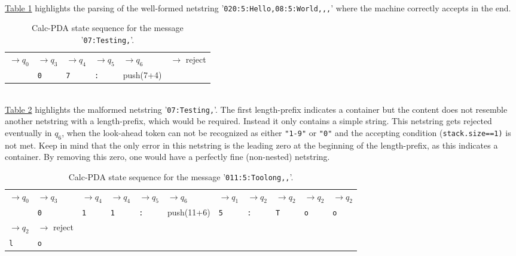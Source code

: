 \\\hyperref[tab:tab1-netstring-1-Calc-pda-state-sequence]{Table 1} highlights the parsing of the well-formed netstring '\texttt{020:5:Hello,08:5:World,,,}' where the machine correctly accepts in the end.\\
\begin{table}
    \centering
    \begin{tabular}{|llllll|}\hline
         $\rightarrow q_0$ &$\rightarrow q_3$ & $\rightarrow q_4$ & $\rightarrow q_5$ & $\rightarrow q_6$ & $\rightarrow$ \tiny{reject}\\
        & \texttt{0} &\texttt{7} &\texttt{:} &\tiny{push(7+4)} &   \\[10pt]\hline
    \end{tabular}
    \caption{Calc-PDA state sequence for the message '\texttt{07:Testing,}'.}
    \label{tab:tab2-netstring-2-Calc-pda-state-sequence}
\end{table}
\\\hyperref[tab:tab2-netstring-2-Calc-pda-state-sequence]{Table 2} highlights the malformed netstring '\texttt{07:Testing,}'. The first length-prefix indicates a container but the content does not resemble another netstring with a length-prefix, which would be required. Instead it only contains a simple string. This netstring gets rejected eventually in $q_6$, when the look-ahead token can not be recognized as either \texttt{"1-9"} or \texttt{"0"} and the accepting condition (\texttt{stack.size==1)} is not met. Keep in mind that the only error in this netstring is the leading zero at the beginning of the length-prefix, as this indicates a container. By removing this zero, one would have a perfectly fine (non-nested) netstring.\\
\begin{table}
    \centering
    \begin{tabular}{|lllllllllll|}\hline
         $\rightarrow q_0$ & $\rightarrow q_3$ & $\rightarrow q_4$ & $\rightarrow q_4$ & $\rightarrow q_5$ & $\rightarrow q_6$ &$\rightarrow q_1$ & $\rightarrow q_2$ & $\rightarrow q_2$ & $\rightarrow q_2$ & $\rightarrow q_2$\\
        &\texttt{0}&\texttt{1}&\texttt{1}&\texttt{:}&\tiny{push(11+6)}& \texttt{5} &\texttt{:} &\texttt{T} & \texttt{o} & \texttt{o}\\[10pt]\hline
         $\rightarrow q_2$ &$\rightarrow$ \tiny{reject} & & & & & & & & &\\
         \texttt{l} & \texttt{o} & & & & & & & & &\\[10pt]\hline
    \end{tabular}
    \caption{Calc-PDA state sequence for the message '\texttt{011:5:Toolong,,}'.}
    \label{tab:tab3-netstring-3-Calc-pda-state-sequence}
\end{table}
